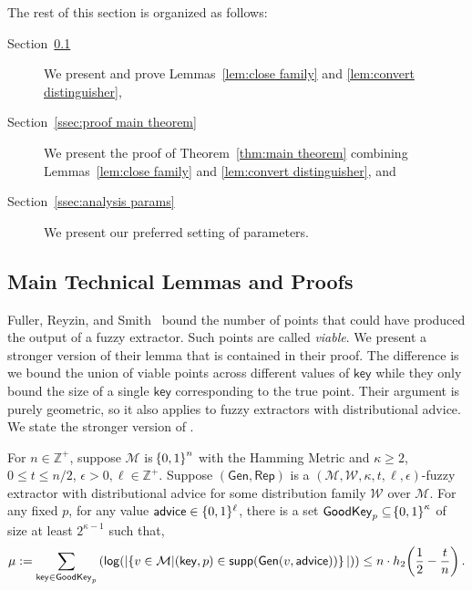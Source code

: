 \noindent
The rest of this section is organized as follows:
\begin{description}
\item[Section~\ref{ssec:proof overview}] We present and prove Lemmas~\ref{lem:close family} and \ref{lem:convert distinguisher},
\item[Section~\ref{ssec:proof main theorem}] We present the proof of Theorem~\ref{thm:main theorem} combining Lemmas~\ref{lem:close family} and \ref{lem:convert distinguisher}, and 
\item[Section~\ref{ssec:analysis params}] We present our preferred setting of parameters.
\end{description}

\subsection{Main Technical Lemmas and Proofs}
\label{ssec:proof overview}





Fuller, Reyzin, and Smith~\cite{fuller2016fuzzy,fuller2020fuzzy} bound the number of points that could have produced the output of a fuzzy extractor.  Such points are called \emph{viable}.  We present a stronger version of their lemma that is contained in their proof.  The difference is we bound the union of viable points across different values of $\mathsf{key}$ while they only bound the size of a single $\mathsf{key}$ corresponding to the true point.  Their argument is purely geometric, so it also applies to fuzzy extractors with distributional advice. 
We state the stronger version of \cite[Lemma 5.2]{fuller2020fuzzy}.

\begin{lemma}
    \label{lem:smallgeneralviable}
For $n\in \mathbb{Z}^+$, suppose $\mathcal{M}$ is $\!\left\{ 0,1 \right\}^{n}$ with the Hamming Metric and $\kappa \geq 2$, $0 \leq t \leq n/2$, $\epsilon > 0, \ell\in\mathbb{Z}^+$. 
    Suppose $(\mathsf{Gen, Rep})$ is a $(\mathcal{M,W},\kappa, t, \ell, \epsilon)$-fuzzy extractor with distributional advice for some distribution family $\mathcal{W}$ over $\mathcal{M}$. 
    For any fixed $p$, for any value ${\mathsf{advice}} \in \{0, 1\}^\ell$, there is a set $\mathsf{GoodKey}_p \subseteq \!\left\{ 0,1 \right\}^{\kappa}$ of size at least $2^{\kappa - 1}$ such that,
    \[
      \mu:= \sum_{\mathsf{key} \in \mathsf{GoodKey}_p} \left( \mathsf{log}\!\left(|\!\left\{ v \in \mathcal{M}|\!\left(\mathsf{key}, p\right) \in \mathsf{supp}\!\left(\mathsf{Gen}(v, {\mathsf{advice}})\right) \right\}|\right)\right) \leq n \cdot h_2\!\left(\frac{1}{2} - \frac{t}{n}\right).
    \]   
\end{lemma}

